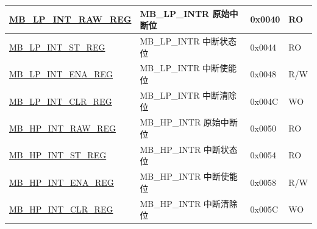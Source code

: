 \begin{longtable}{ | p{6cm} | p{7.2cm} | p{1.3cm} | p{1cm} | }
\hyperref[regdesc:MBLPINTRAWREG]{MB\_LP\_INT\_RAW\_REG} & MB\_LP\_INTR 原始中断位 & 0x0040 & RO \\ \hline
\hyperref[regdesc:MBLPINTSTREG]{MB\_LP\_INT\_ST\_REG} & MB\_LP\_INTR 中断状态位 & 0x0044 & RO \\ \hline
\hyperref[regdesc:MBLPINTENAREG]{MB\_LP\_INT\_ENA\_REG} & MB\_LP\_INTR 中断使能位 & 0x0048 & R/W \\ \hline
\hyperref[regdesc:MBLPINTCLRREG]{MB\_LP\_INT\_CLR\_REG} & MB\_LP\_INTR 中断清除位 & 0x004C & WO \\ \hline
\hyperref[regdesc:MBHPINTRAWREG]{MB\_HP\_INT\_RAW\_REG} & MB\_HP\_INTR 原始中断位 & 0x0050 & RO \\ \hline
\hyperref[regdesc:MBHPINTSTREG]{MB\_HP\_INT\_ST\_REG} & MB\_HP\_INTR 中断状态位 & 0x0054 & RO \\ \hline
\hyperref[regdesc:MBHPINTENAREG]{MB\_HP\_INT\_ENA\_REG} & MB\_HP\_INTR 中断使能位 & 0x0058 & R/W \\ \hline
\hyperref[regdesc:MBHPINTCLRREG]{MB\_HP\_INT\_CLR\_REG} & MB\_HP\_INTR 中断清除位 & 0x005C & WO \\ \hline
\end{longtable}
